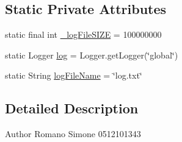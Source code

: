 \subsection*{Static Private Attributes}
\begin{DoxyCompactItemize}
\item 
static final int \hyperlink{classit_1_1isislab_1_1masonhelperdocumentation_1_1mason_1_1wizards_1_1_m_a_s_o_n_documentation_wizard_aceaf93376094874691a1eb188e8b3185}{\-\_\-log\-File\-S\-I\-Z\-E} = 100000000
\item 
static Logger \hyperlink{classit_1_1isislab_1_1masonhelperdocumentation_1_1mason_1_1wizards_1_1_m_a_s_o_n_documentation_wizard_ad7cf684a5c448aa057721a59401e2a5d}{log} = Logger.\-get\-Logger(\char`\"{}global\char`\"{})
\item 
static String \hyperlink{classit_1_1isislab_1_1masonhelperdocumentation_1_1mason_1_1wizards_1_1_m_a_s_o_n_documentation_wizard_a8cff8f361185fdae7ef6d181e2bef353}{log\-File\-Name} = \char`\"{}log.\-txt\char`\"{}
\end{DoxyCompactItemize}


\subsection{Detailed Description}
\begin{DoxyAuthor}{Author}
Romano Simone 0512101343 
\end{DoxyAuthor}


